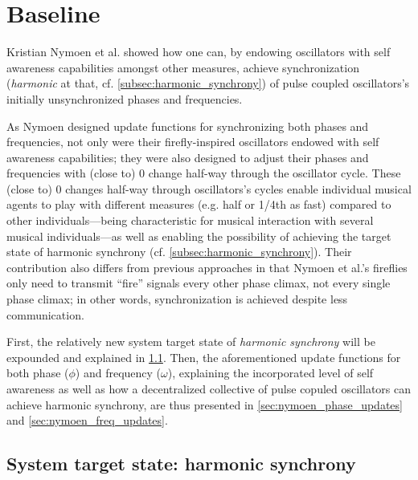 \chapter{Baseline}
\label{chap:baseline}






Kristian Nymoen et al. \cite{nymoen_synch} showed how one can, by endowing oscillators with self awareness capabilities amongst other measures, achieve synchronization (\textit{harmonic} at that, cf. \ref{subsec:harmonic_synchrony}) of pulse coupled oscillators's initially unsynchronized phases and frequencies.

As Nymoen designed update functions for synchronizing both phases and frequencies, not only were their firefly-inspired oscillators endowed with self awareness capabilities; they were also designed to adjust their phases and frequencies with (close to) 0 change half-way through the oscillator cycle. These (close to) 0 changes half-way through oscillators's cycles enable individual musical agents to play with different measures (e.g. half or 1/4th as fast) compared to other individuals—being characteristic for musical interaction with several musical individuals—as well as enabling the possibility of achieving the target state of harmonic synchrony (cf. \ref{subsec:harmonic_synchrony}). Their contribution also differs from previous approaches in that Nymoen et al.'s fireflies only need to transmit ``fire'' signals every other phase climax, not every single phase climax; in other words, synchronization is achieved despite less communication.

First, the relatively new system target state of \textit{harmonic synchrony} will be expounded and explained in \ref{sec:harmonic_synchrony}. Then, the aforementioned update functions for both phase ($\phi$) and frequency ($\omega$), explaining the incorporated level of self awareness as well as how a decentralized collective of pulse copuled oscillators can achieve harmonic synchrony, are thus presented in \ref{sec:nymoen_phase_updates} and \ref{sec:nymoen_freq_updates}.



\section{System target state: harmonic synchrony}
\label{sec:harmonic_synchrony}

